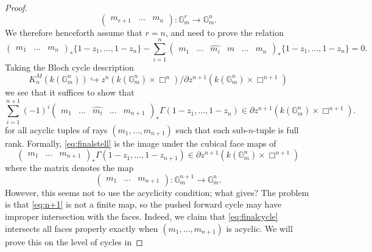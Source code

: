 \documentclass[10pt]{amsart}
\theoremstyle{definition}
\numberwithin{equation}{section}
\begin{document}
\begin{proof}
        \[
        \begin{pmatrix}m_{r+1}&\ldots & m_n\end{pmatrix}: \mathbb{G}_m^r \to \mathbb{G}_m^n.
        \]
        We therefore henceforth assume that $r=n$, and need to prove the relation 
        \[
        \begin{pmatrix}m_1&\ldots & m_n\end{pmatrix}_* \{1-z_1,\ldots, 1-z_n\} - \sum_{i=1}^n \begin{pmatrix}m_1&\ldots& \hat{m_i} & m & \ldots   & m_n\end{pmatrix}_* \{1-z_1,\ldots, 1-z_n\} =0.
        \]
        Taking the Bloch cycle description
        \[
        K_n^M(k(\mathbb{G}_m^n)) \hookrightarrow z^n(k(\mathbb{G}_m^n)\times \Box^n)/\partial z^{n+1}(k(\mathbb{G}_m^n)\times \Box^{n+1})
        \]
        we see that it suffices to show that 
        \begin{equation} \label{eq:finalstell}
        \sum_{i=1}^{n+1} (-1)^i \begin{pmatrix}m_1&\ldots& \hat{m_i} & \ldots   & m_{n+1}\end{pmatrix}_* \Gamma(1-z_1,\ldots, 1-z_n) \in \partial z^{n+1}(k(\mathbb{G}_m^n)\times \Box^{n+1}).
        \end{equation}
        for all acyclic tuples of rays $(m_1,\ldots, m_{n+1})$ such that each sub-$n$-tuple is full rank. Formally, \eqref{eq:finalstell} is the image under the cubical face maps of
        \begin{equation} \label{eq:finalcycle}
        \begin{pmatrix}m_1&\ldots & m_{n+1}\end{pmatrix}_* \Gamma(1-z_1,\ldots, 1-z_{n+1})\in \partial z^{n+1}(k(\mathbb{G}_m^n)\times \Box^{n+1})
        \end{equation}
        where the matrix denotes the map
        \begin{equation}\label{eq:n+1}
        \begin{pmatrix}m_1&\ldots & m_{n+1}\end{pmatrix}: \mathbb{G}_m^{n+1}\to \mathbb{G}_m^n.
        \end{equation}
        However, this seems not to use the acyclicity condition; what gives? The problem is that \eqref{eq:n+1} is not a finite map, so the pushed forward cycle may have improper intersection with the faces. Indeed, we claim that \eqref{eq:finalcycle} intersects all faces properly exactly when $(m_1,\ldots, m_{n+1})$ is acyclic. We will prove this on the level of cycles in 

\end{proof}
\end{document}

